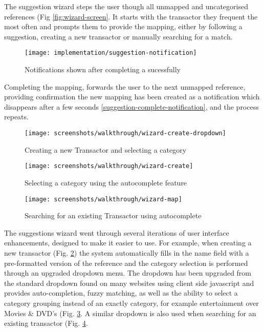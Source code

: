 The suggestion wizard steps the user though all unmapped and uncategorised references (Fig \ref{fig:wizard-screen}. It starts with the transactor they frequent the most often and prompts them to provide the mapping, either by following a suggestion, creating a new transactor or manually searching for a match.

\begin{figure}
\centering
\texttt{[image: implementation/suggestion-notification]}
\caption{Notifications shown after completing a sucessfully}
\label{fig:suggestion-complete-notification}
\end{figure}

Completing the mapping, forwards the user to the next unmapped reference, providing confirmation the new mapping has been created as a notification which disappears after a few seconds \ref{suggestion-complete-notification}, and the process repeats.

\begin{figure}
\centering
\texttt{[image: screenshots/walkthrough/wizard-create-dropdown]}
\caption{Creating a new Transactor and selecting a category}
\label{fig:create-new-transactor}
\end{figure}

\begin{figure}
\centering
\texttt{[image: screenshots/walkthrough/wizard-create]}
\caption{Selecting a category using the autocomplete feature}
\label{fig:dropdown-autocomplete}
\end{figure}

\begin{figure}
\centering
\texttt{[image: screenshots/walkthrough/wizard-map]}
\caption{Searching for an existing Transactor using autocomplete}
\label{fig:wizard-map-dropdown}
\end{figure}

The suggestions wizard went through several iterations of user interface enhancements, designed to make it easier to use.
%
For example, when creating a new transactor (Fig. \ref{fig:create-new-transactor}) the system automatically fills in the name field with a pre-formatted version of the reference and the category selection is performed through an upgraded dropdown menu. The dropdown has been upgraded from the standard dropdown found on many websites using client side javascript and provides auto-completion, fuzzy matching, as well as the ability to select a category grouping instead of an exactly category, for example entertainment over Movies \& DVD's (Fig. \ref{fig:dropdown-autocomplete}. A similar dropdown is also used when searching for an existing transactor (Fig. \ref{fig:wizard-map-dropdown}.

